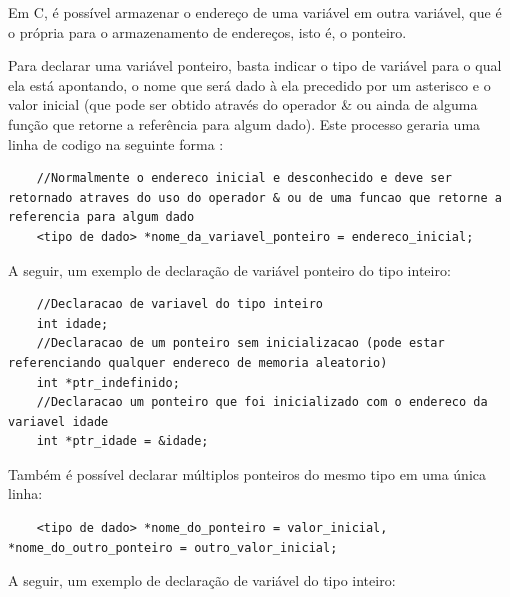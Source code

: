 \documentclass[12pt]{article}
\newcommand\tab[1][1cm]{\hspace*{#1}}
\begin{document}
\par\tab Em C, é possível armazenar o endereço de uma variável em outra variável, que é o própria para o armazenamento de endereços, isto é, o ponteiro.

\par\tab Para declarar uma variável ponteiro, basta indicar o tipo de variável para o qual ela está apontando, o nome que será dado à ela precedido por um asterisco e o valor inicial (que pode ser obtido através do operador \& ou ainda de alguma função que retorne a referência para algum dado). Este processo geraria uma linha de codigo na seguinte forma :

\hspace{0.25cm}
\begin{lstlisting}
    //Normalmente o endereco inicial e desconhecido e deve ser retornado atraves do uso do operador & ou de uma funcao que retorne a referencia para algum dado
    <tipo de dado> *nome_da_variavel_ponteiro = endereco_inicial;
\end{lstlisting}

\hspace{0.25cm}
\par\tab A seguir, um exemplo de declaração de variável ponteiro do tipo inteiro:

\hspace{0.25cm}
\begin{lstlisting}
    //Declaracao de variavel do tipo inteiro
    int idade;
    //Declaracao de um ponteiro sem inicializacao (pode estar referenciando qualquer endereco de memoria aleatorio)
    int *ptr_indefinido;
    //Declaracao um ponteiro que foi inicializado com o endereco da variavel idade
    int *ptr_idade = &idade;
\end{lstlisting}

\hspace{0.25cm}
\par\tab Também é possível declarar múltiplos ponteiros do mesmo tipo em uma única linha:

\newpage

\hspace{0.25cm}
\begin{lstlisting}
    <tipo de dado> *nome_do_ponteiro = valor_inicial, *nome_do_outro_ponteiro = outro_valor_inicial;
\end{lstlisting}

\par\tab A seguir, um exemplo de declaração de variável do tipo inteiro:
\end{document}

